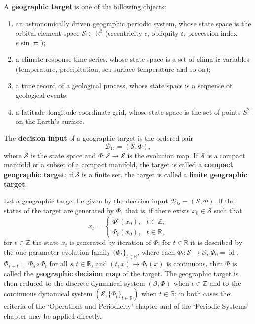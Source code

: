 \begin{definition}\label{def:geo_target}
A \textbf{geographic target} is one of the following objects:
\begin{enumerate}[label=(\roman*)]
    \item an astronomically driven geographic periodic system, whose state space is the orbital-element space $\mathcal S\subset\mathbb R^3$ (eccentricity $e$, obliquity $\varepsilon$, precession index $e\sin\varpi$);
    \item a climate-response time series, whose state space is a set of climatic variables (temperature, precipitation, sea-surface temperature and so on);
    \item a time record of a geological process, whose state space is a sequence of geological events;
    \item a latitude--longitude coordinate grid, whose state space is the set of points $S^2$ on the Earth's surface.
\end{enumerate}
The \textbf{decision input} of a geographic target is the ordered pair
\[
\mathcal D_{\mathrm{G}}=(\mathcal S,\Phi),
\]
where $\mathcal S$ is the state space and $\Phi:\mathcal S\to\mathcal S$ is the evolution map. If $\mathcal S$ is a compact manifold or a subset of a compact manifold, the target is called a \textbf{compact geographic target}; if $\mathcal S$ is a finite set, the target is called a \textbf{finite geographic target}.
\end{definition}

\begin{definition}\label{def:geo_periodization}
Let a geographic target be given by the decision input $\mathcal D_{\mathrm{G}}=(\mathcal S,\Phi)$. If the states of the target are generated by $\Phi$, that is, if there exists $x_0\in\mathcal S$ such that
\[
x_t=\begin{cases}\Phi^t(x_0), & t\in\mathbb Z,\\ \Phi_t(x_0), & t\in\mathbb R,\end{cases}
\]
for $t\in\mathbb Z$ the state $x_t$ is generated by iteration of $\Phi$; for $t\in\mathbb R$ it is described by the one-parameter evolution family $\{\Phi_t\}_{t\in\mathbb R}$, where each $\Phi_t:\mathcal S\to\mathcal S$, $\Phi_0=\operatorname{id}$, $\Phi_{s+t}=\Phi_s\circ\Phi_t$ for all $s,t\in\mathbb R$, and $(t,x)\mapsto\Phi_t(x)$ is continuous.
then $\Phi$ is called the \textbf{geographic decision map} of the target. The geographic target is then reduced to the discrete dynamical system $(\mathcal S,\Phi)$ when $t\in\mathbb Z$ and to the continuous dynamical system $(\mathcal S,\{\Phi_t\}_{t\in\mathbb R})$ when $t\in\mathbb R$; in both cases the criteria of the `Operations and Periodicity' chapter and of the `Periodic Systems' chapter may be applied directly.
\end{definition}

